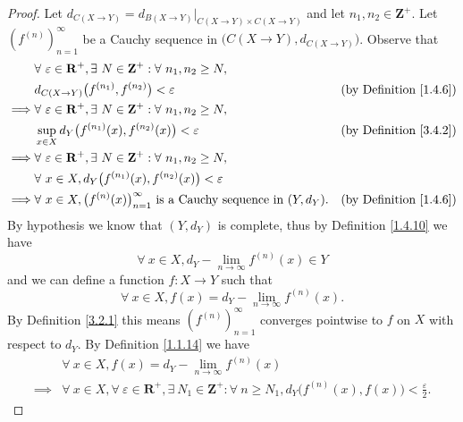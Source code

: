 \begin{proof}
    Let \(d_{C(X \to Y)} = d_{B(X \to Y)}|_{C(X \to Y) \times C(X \to Y)}\) and let \(n_1, n_2 \in \mathbf{Z}^+\).
    Let \((f^{(n)})_{n = 1}^\infty\) be a Cauchy sequence in \(\big(C(X \to Y), d_{C(X \to Y)}\big)\).
    Observe that
    \begin{align*}
                 & \forall\ \varepsilon \in \mathbf{R}^+, \exists\ N \in \mathbf{Z}^+ : \forall\ n_1, n_2 \geq N,                                        \\
                 & d_{C(X \to Y)}\big(f^{(n_1)}, f^{(n_2)}\big) < \varepsilon                                       & \text{(by Definition \ref{1.4.6})} \\
        \implies & \forall\ \varepsilon \in \mathbf{R}^+, \exists\ N \in \mathbf{Z}^+ : \forall\ n_1, n_2 \geq N,                                        \\
                 & \sup_{x \in X} d_Y\big(f^{(n_1)}(x), f^{(n_2)}(x)\big) < \varepsilon                             & \text{(by Definition \ref{3.4.2})} \\
        \implies & \forall\ \varepsilon \in \mathbf{R}^+, \exists\ N \in \mathbf{Z}^+ : \forall\ n_1, n_2 \geq N,                                        \\
                 & \forall\ x \in X, d_Y\big(f^{(n_1)}(x), f^{(n_2)}(x)\big) < \varepsilon                                                               \\
        \implies & \forall\ x \in X, \big(f^{(n)}(x)\big)_{n = 1}^\infty \text{ is a Cauchy sequence in } (Y, d_Y). & \text{(by Definition \ref{1.4.6})}
    \end{align*}
    By hypothesis we know that \((Y, d_Y)\) is complete, thus by Definition \ref{1.4.10} we have
    \[
        \forall\ x \in X, d_Y - \lim_{n \to \infty} f^{(n)}(x) \in Y
    \]
    and we can define a function \(f : X \to Y\) such that
    \[
        \forall\ x \in X, f(x) = d_Y - \lim_{n \to \infty} f^{(n)}(x).
    \]
    By Definition \ref{3.2.1} this means \((f^{(n)})_{n = 1}^\infty\) converges pointwise to \(f\) on \(X\) with respect to \(d_Y\).
    By Definition \ref{1.1.14} we have
    \begin{align*}
                 & \forall\ x \in X, f(x) = d_Y - \lim_{n \to \infty} f^{(n)}(x)                                                                                                        \\
        \implies & \forall\ x \in X, \forall\ \varepsilon \in \mathbf{R}^+, \exists\ N_1 \in \mathbf{Z}^+ : \forall\ n \geq N_1, d_Y\big(f^{(n)}(x), f(x)\big) < \frac{\varepsilon}{2}.

\end{align*}
\end{proof}
